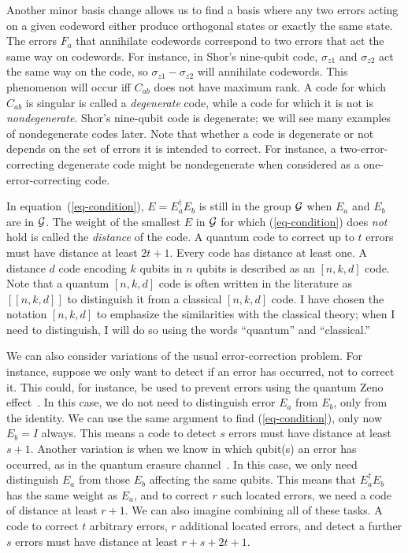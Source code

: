 \documentclass{report}
\newcommand{\G}{{\cal G}}
\newcommand{\Zs}[1]{\sigma_{z{#1}}}
\begin{document}
Another minor basis change allows us to find a basis where any two errors 
acting on a given codeword either produce orthogonal states or exactly the 
same state.  The errors $F_a$  that annihilate codewords correspond to two 
errors that act the same way on codewords.  For instance, in Shor's 
nine-qubit code, $\Zs{1}$ and $\Zs{2}$ act the same way on the code, so $\Zs{1} 
- \Zs{2}$ will annihilate codewords.  This phenomenon will occur iff $C_{ab}$ 
does not have maximum rank.  A code for which $C_{ab}$ is singular is 
called a {\em degenerate} code, while a code for which it is not is {\em 
nondegenerate}.  Shor's nine-qubit code is degenerate; we will see many 
examples of nondegenerate codes later.  Note that whether a code is 
degenerate or not depends on the set of errors it is intended to correct.  
For instance, a two-error-correcting degenerate code might be 
nondegenerate when considered as a one-error-correcting code.

In equation~(\ref{eq-condition}), $E = E_a^\dagger E_b$ is still in the group 
$\G$ when $E_a$ and $E_b$ are in $\G$.  The weight of the smallest $E$ in 
$\G$ for which (\ref{eq-condition}) does {\em not} hold is called the {\em 
distance} of the code.  A quantum code to correct up to $t$ errors must 
have distance at least $2t+1$.  Every code has distance at least one.  A
distance $d$ code encoding $k$ qubits in $n$ qubits is described as an
$[n, k, d]$ code.  Note that a quantum $[n,k,d]$ code is often written
in the literature as $[[n,k,d]]$ to distinguish it from a classical
$[n,k,d]$ code.  I have chosen the notation $[n,k,d]$ to emphasize the
similarities with the classical theory; when I need to distinguish, I
will do so using the words ``quantum'' and ``classical.''

We can also consider variations of the usual error-correction problem.  
For instance, suppose we only want to detect if an error has occurred, not 
to correct it.  This could, for instance, be used to prevent errors using the 
quantum Zeno effect~\cite{vaidman}.  In this case, we do not need to 
distinguish error $E_a$ from $E_b$, only from the identity.  We can use the 
same argument to find (\ref{eq-condition}), only now $E_b = I$ always.  
This means a code to detect $s$ errors must have distance at least $s+1$.  
Another variation is when we know in which qubit(s) an error has 
occurred, as in the quantum erasure channel~\cite{grassl}.  In this case, we 
only need distinguish $E_a$ from those $E_b$ affecting the same qubits.  
This means that $E_a^\dagger E_b$ has the same weight as $E_a$, and to correct 
$r$ such located errors, we need a code of distance at least $r+1$.  We can 
also imagine combining all of these tasks.  A code to correct $t$ arbitrary 
errors, $r$ additional located errors, and detect a further $s$ errors must 
have distance at least $r + s + 2t + 1$.
\end{document}

